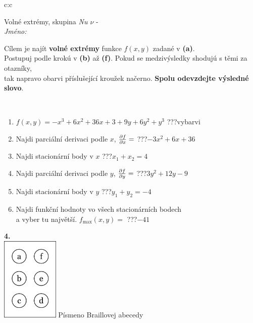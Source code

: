 \documentclass[10pt]{report}
\begin{document}
\begin{tabular}{c:c}
\begin{minipage}[c][104.5mm][t]{0.5\linewidth}
\begin{center}
\vspace{7mm}
{\huge Volné extrémy, skupina \textit{Nu $\nu$} -}\\[5mm]
\textit{Jméno:}\phantom{xxxxxxxxxxxxxxxxxxxxxxxxxxxxxxxxxxxxxxxxxxxxxxxxxxxxxxxxxxxxxxxxx}\\[5mm]
\begin{minipage}{0.95\linewidth}
\begin{center}
Cílem je najít \textbf{volné extrémy} funkce $f(x,y)$ zadané v \textbf{(a)}.\\Postupuj podle krokú v \textbf{(b)} až \textbf{(f)}. Pokud se medzivýsledky shodujú s těmi za otazníky,\\tak napravo obarvi příslušející kroužek načerno. \textbf{Spolu odevzdejte výsledné slovo}.
\end{center}
\end{minipage}
\\[1mm]
\begin{minipage}{0.79\linewidth}
\begin{center}
\begin{varwidth}{\linewidth}
\begin{enumerate}
\normalsize
\item $f(x,y)=-x^3+6x^2+36x+3+9y+6y^2+y^3$\quad \dotfill\; ???\;\dotfill \quad vybarvi
\item Najdi parciální derivaci podle $x$, $\pdv{f}{x}=$\quad \dotfill\; ???\;\dotfill \quad $-3x^2+6x+36$
\item Najdi stacionární body v $x$\quad \dotfill\; ???\;\dotfill \quad $x_1+x_2=4$
\item Najdi parciální derivaci podle $y$, $\pdv{f}{y}=$\quad \dotfill\; ???\;\dotfill \quad $3y^2+12y-9$
\item Najdi stacionární body v $y$\quad \dotfill\; ???\;\dotfill \quad $y_1+y_2=-4$
\item Najdi funkční hodnoty vo všech stacionárních bodech \\ \phantom{xxxxxx} a vyber tu najvětší. $f_{\text{max}}(x,y)=$\quad \dotfill\; ???\;\dotfill \quad $-41$
\end{enumerate}
\end{varwidth}
\end{center}
\end{minipage}
\begin{minipage}{0.20\linewidth}
\begin{center}
{\Huge\bfseries 4.} \\[2mm]
\includegraphics[height=40mm]{../images/braille.png}
{\small Písmeno Braillovej abecedy}
\end{center}
\end{minipage}
\end{center}
\end{minipage}
%
\end{tabular}
\end{document}
